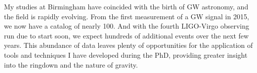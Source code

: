 \documentclass[
12pt, %
english, %
doublespacing, %
headsepline, %
]{MastersDoctoralThesis} %
\begin{document}
My studies at Birmingham have coincided with the birth of GW astronomy, and the field is rapidly evolving.
From the first measurement of a GW signal in 2015, we now have a catalog of nearly 100.
And with the fourth LIGO-Virgo observing run due to start soon, we expect hundreds of additional events over the next few years.
This abundance of data leaves plenty of opportunities for the application of tools and techniques I have developed during the PhD, providing greater insight into the ringdown and the nature of gravity.







%
%
%


\singlespacing
\printbibliography

\end{document}
